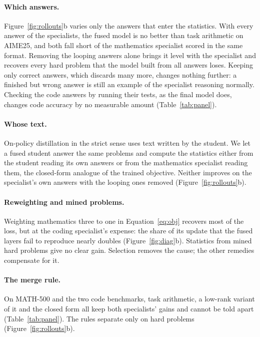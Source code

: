 \paragraph{Which answers.} Figure~\ref{fig:rollouts}b varies only the answers
that enter the statistics. With every answer of the specialists, the fused
model is no better than task arithmetic on AIME25, and both fall short of the
mathematics specialist scored in the same format. Removing the looping
answers alone brings it level with the specialist and recovers every hard
problem that the model built from all answers loses. Keeping only correct
answers, which discards many more, changes nothing further: a finished but
wrong answer is still an example of the specialist reasoning normally.
Checking the code answers by running their tests, as the final model does,
changes code accuracy by no measurable amount (Table~\ref{tab:panel}).

\paragraph{Whose text.} On-policy distillation in the strict sense uses text
written by the student. We let a fused student answer the same problems and
compute the statistics either from the student reading its own answers or
from the mathematics specialist reading them, the closed-form analogue of
the trained objective. Neither improves on the specialist's own answers with
the looping ones removed (Figure~\ref{fig:rollouts}b).

\paragraph{Reweighting and mined problems.} Weighting mathematics three to
one in Equation~\eqref{eq:obj} recovers most of the loss, but at the coding
specialist's expense: the share of its update that the fused layers fail to
reproduce nearly doubles (Figure~\ref{fig:diag}b). Statistics from mined hard
problems give no clear gain. Selection removes the cause; the other remedies
compensate for it.

\paragraph{The merge rule.} On MATH-500 and the two code benchmarks, task
arithmetic, a low-rank variant of it and the closed form all keep both
specialists' gains and cannot be told apart (Table~\ref{tab:panel}). The
rules separate only on hard problems (Figure~\ref{fig:rollouts}b).


